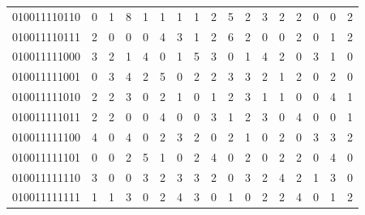 \documentclass[10pt,a4paper]{article}
\begin{document}
\begin{longtable}{ |c|c|c|c|c|c|c|c|c|c|c|c|c|c|c|c|c| }
    010011110110              & 0                            & 1                                & 8                            & 1                              & 1   & 1   & 1   & 2   & 5   & 2   & 3   & 2   & 2   & 0   & 0   & 2   \\
    010011110111              & 2                            & 0                                & 0                            & 0                              & 4   & 3   & 1   & 2   & 6   & 2   & 0   & 0   & 2   & 0   & 1   & 2   \\
    010011111000              & 3                            & 2                                & 1                            & 4                              & 0   & 1   & 5   & 3   & 0   & 1   & 4   & 2   & 0   & 3   & 1   & 0   \\
    010011111001              & 0                            & 3                                & 4                            & 2                              & 5   & 0   & 2   & 2   & 3   & 3   & 2   & 1   & 2   & 0   & 2   & 0   \\
    010011111010              & 2                            & 2                                & 3                            & 0                              & 2   & 1   & 0   & 1   & 2   & 3   & 1   & 1   & 0   & 0   & 4   & 1   \\
    010011111011              & 2                            & 2                                & 0                            & 0                              & 4   & 0   & 0   & 3   & 1   & 2   & 3   & 0   & 4   & 0   & 0   & 1   \\
    010011111100              & 4                            & 0                                & 4                            & 0                              & 2   & 3   & 2   & 0   & 2   & 1   & 0   & 2   & 0   & 3   & 3   & 2   \\
    010011111101              & 0                            & 0                                & 2                            & 5                              & 1   & 0   & 2   & 4   & 0   & 2   & 0   & 2   & 2   & 0   & 4   & 0   \\
    010011111110              & 3                            & 0                                & 0                            & 3                              & 2   & 3   & 3   & 2   & 0   & 3   & 2   & 4   & 2   & 1   & 3   & 0   \\
    010011111111              & 1                            & 1                                & 3                            & 0                              & 2   & 4   & 3   & 0   & 1   & 0   & 2   & 2   & 4   & 0   & 1   & 2   \\

\end{longtable}
\end{document}
